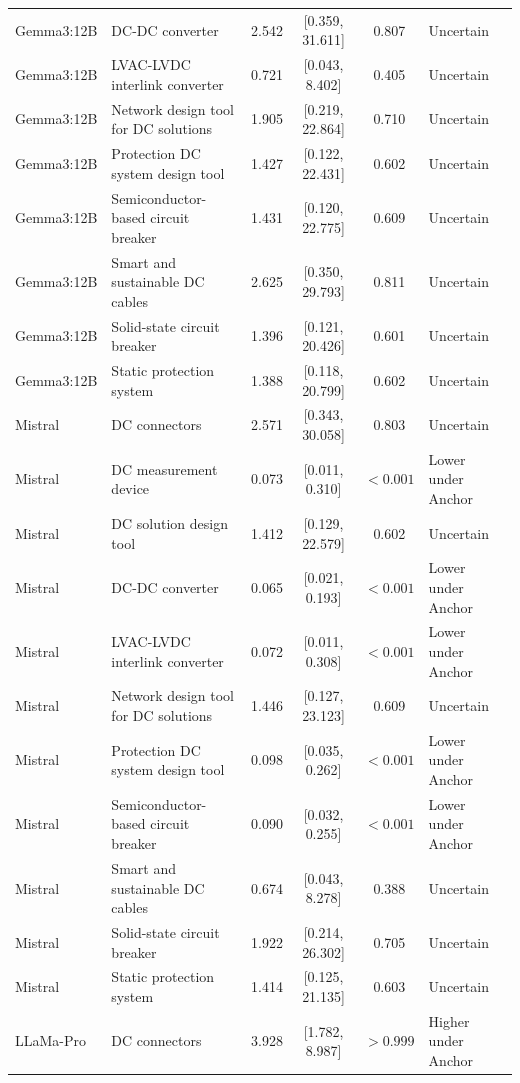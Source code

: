 \begin{longtable}[tbp]{p{2.2cm}p{5.0cm}cccp{3.2cm}}
Gemma3:12B & DC-DC converter & 2.542 & [0.359, 31.611] & 0.807 & Uncertain \\
Gemma3:12B & LVAC-LVDC interlink converter & 0.721 & [0.043, 8.402] & 0.405 & Uncertain \\
Gemma3:12B & Network design tool for DC solutions & 1.905 & [0.219, 22.864] & 0.710 & Uncertain \\
Gemma3:12B & Protection DC system design tool & 1.427 & [0.122, 22.431] & 0.602 & Uncertain \\
Gemma3:12B & Semiconductor-based circuit breaker & 1.431 & [0.120, 22.775] & 0.609 & Uncertain \\
Gemma3:12B & Smart and sustainable DC cables & 2.625 & [0.350, 29.793] & 0.811 & Uncertain \\
Gemma3:12B & Solid-state circuit breaker & 1.396 & [0.121, 20.426] & 0.601 & Uncertain \\
Gemma3:12B & Static protection system & 1.388 & [0.118, 20.799] & 0.602 & Uncertain \\
Mistral & DC connectors & 2.571 & [0.343, 30.058] & 0.803 & Uncertain \\
Mistral & DC measurement device & 0.073 & [0.011, 0.310] & $<0.001$ & Lower under Anchor \\
Mistral & DC solution design tool & 1.412 & [0.129, 22.579] & 0.602 & Uncertain \\
Mistral & DC-DC converter & 0.065 & [0.021, 0.193] & $<0.001$ & Lower under Anchor \\
Mistral & LVAC-LVDC interlink converter & 0.072 & [0.011, 0.308] & $<0.001$ & Lower under Anchor \\
Mistral & Network design tool for DC solutions & 1.446 & [0.127, 23.123] & 0.609 & Uncertain \\
Mistral & Protection DC system design tool & 0.098 & [0.035, 0.262] & $<0.001$ & Lower under Anchor \\
Mistral & Semiconductor-based circuit breaker & 0.090 & [0.032, 0.255] & $<0.001$ & Lower under Anchor \\
Mistral & Smart and sustainable DC cables & 0.674 & [0.043, 8.278] & 0.388 & Uncertain \\
Mistral & Solid-state circuit breaker & 1.922 & [0.214, 26.302] & 0.705 & Uncertain \\
Mistral & Static protection system & 1.414 & [0.125, 21.135] & 0.603 & Uncertain \\
LLaMa-Pro & DC connectors & 3.928 & [1.782, 8.987] & $>0.999$ & Higher under Anchor \\

\end{longtable}
